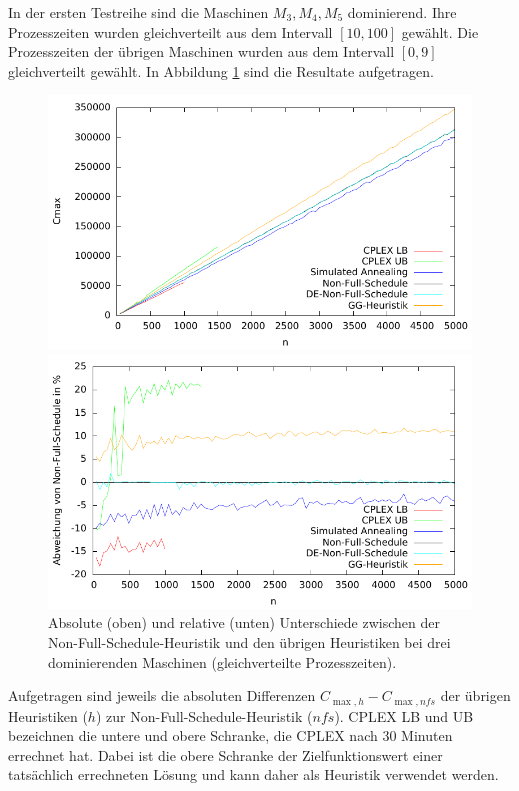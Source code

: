 \documentclass{scrreprt}
\begin{document}
In der ersten Testreihe sind die Maschinen $M_3,M_4,M_5$ dominierend.
Ihre Prozesszeiten wurden gleichverteilt aus dem Intervall $[10,100]$ gewählt.
Die Prozesszeiten der übrigen Maschinen wurden aus dem Intervall $[0,9]$ gleichverteilt gewählt.
In Abbildung \ref{abb:3dom} sind die Resultate aufgetragen.
\begin{figure}
    \begin{center}
        \includegraphics[width=.8\textwidth]{../instances/3dom/plot.pdf}
    \end{center}
    \begin{center}
        \includegraphics[width=.8\textwidth]{../instances/3dom/plotrel.pdf}
    \end{center}
    \caption{
        \label{abb:3dom}
        Absolute (oben) und relative (unten) Unterschiede zwischen der Non-Full-Schedule-Heuristik und den übrigen Heuristiken
        bei drei dominierenden Maschinen (gleichverteilte Prozesszeiten).
    }
\end{figure}
Aufgetragen sind jeweils die absoluten Differenzen $C_{\max,h}-C_{\max,nfs}$ der übrigen Heuristiken ($h$) zur Non-Full-Schedule-Heuristik ($nfs$).
CPLEX LB und UB bezeichnen die untere und obere Schranke, die CPLEX nach 30 Minuten errechnet hat.
Dabei ist die obere Schranke der Zielfunktionswert einer tatsächlich errechneten Lösung und kann daher als Heuristik verwendet werden.
\end{document}
